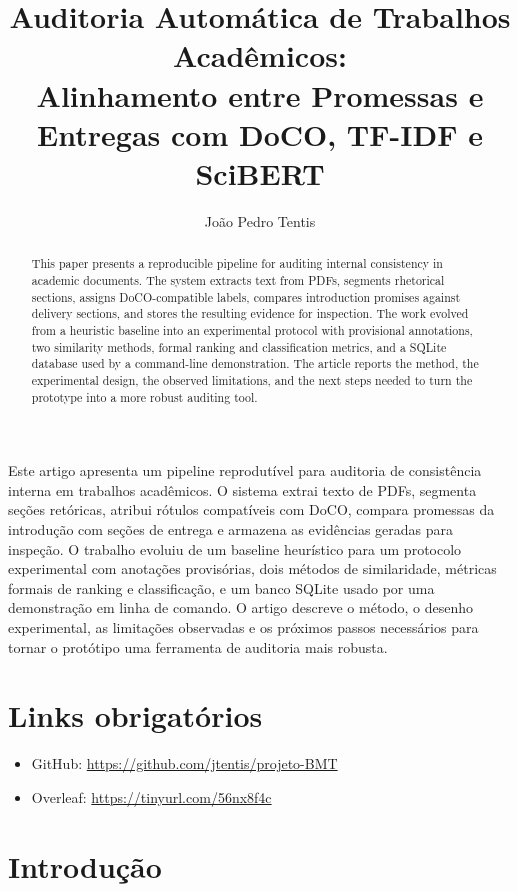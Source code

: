 \documentclass[12pt]{article}
\title{\textbf{Auditoria Automática de Trabalhos Acadêmicos:\\
Alinhamento entre Promessas e Entregas com DoCO, TF-IDF e SciBERT}}
\author{João Pedro Tentis\inst{1}}
\begin{document}
\maketitle

\begin{abstract}
This paper presents a reproducible pipeline for auditing internal consistency in academic documents. The system extracts text from PDFs, segments rhetorical sections, assigns DoCO-compatible labels, compares introduction promises against delivery sections, and stores the resulting evidence for inspection. The work evolved from a heuristic baseline into an experimental protocol with provisional annotations, two similarity methods, formal ranking and classification metrics, and a SQLite database used by a command-line demonstration. The article reports the method, the experimental design, the observed limitations, and the next steps needed to turn the prototype into a more robust auditing tool.
\end{abstract}

\begin{resumo}
Este artigo apresenta um pipeline reprodutível para auditoria de consistência interna em trabalhos acadêmicos. O sistema extrai texto de PDFs, segmenta seções retóricas, atribui rótulos compatíveis com DoCO, compara promessas da introdução com seções de entrega e armazena as evidências geradas para inspeção. O trabalho evoluiu de um baseline heurístico para um protocolo experimental com anotações provisórias, dois métodos de similaridade, métricas formais de ranking e classificação, e um banco SQLite usado por uma demonstração em linha de comando. O artigo descreve o método, o desenho experimental, as limitações observadas e os próximos passos necessários para tornar o protótipo uma ferramenta de auditoria mais robusta.
\end{resumo}

\section{Links obrigatórios}

\begin{itemize}
    \item GitHub: \url{https://github.com/jtentis/projeto-BMT}
    \item Overleaf: \url{https://tinyurl.com/56nx8f4c}
\end{itemize}

\section{Introdução}
\end{document}
